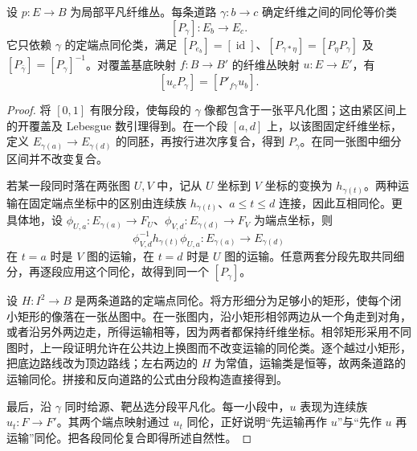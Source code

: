 \begin{proposition}\label{g2:prop:fiber-transport}
	设 \(p:E\to B\) 为局部平凡纤维丛。每条道路 \(\gamma:b\to c\) 确定纤维之间的同伦等价类
	\[
		[P_\gamma]:E_b\longrightarrow E_c.
	\]
	它只依赖 \(\gamma\) 的定端点同伦类，满足 \([P_{e_b}]=[\operatorname{id}]\)、\([P_{\gamma*\eta}]=[P_\eta P_\gamma]\) 及 \([P_{\bar\gamma}]=[P_\gamma]^{-1}\)。对覆盖基底映射 \(f:B\to B'\) 的纤维丛映射 \(u:E\to E'\)，有
	\[
		[u_cP_\gamma]=[P'_{f\gamma}u_b].
	\]
\end{proposition}
\begin{proof}
	将 \([0,1]\) 有限分段，使每段的 \(\gamma\) 像都包含于一张平凡化图；这由紧区间上的开覆盖及 Lebesgue 数引理得到。在一个段 \([a,d]\) 上，以该图固定纤维坐标，定义 \(E_{\gamma(a)}\to E_{\gamma(d)}\) 的同胚，再按行进次序复合，得到 \(P_\gamma\)。在同一张图中细分区间并不改变复合。

	若某一段同时落在两张图 \(U,V\) 中，记从 \(U\) 坐标到 \(V\) 坐标的变换为 \(h_{\gamma(t)}\)。两种运输在固定端点坐标中的区别由连续族 \(h_{\gamma(t)}\)、\(a\leq t\leq d\) 连接，因此互相同伦。更具体地，设 \(\phi_{U,a}:E_{\gamma(a)}\to F_U\)、\(\phi_{V,d}:E_{\gamma(d)}\to F_V\) 为端点坐标，则
	\[
		\phi_{V,d}^{-1}h_{\gamma(t)}\phi_{U,a}:E_{\gamma(a)}\longrightarrow E_{\gamma(d)}
	\]
	在 \(t=a\) 时是 \(V\) 图的运输，在 \(t=d\) 时是 \(U\) 图的运输。任意两套分段先取共同细分，再逐段应用这个同伦，故得到同一个 \([P_\gamma]\)。

	设 \(H:I^2\to B\) 是两条道路的定端点同伦。将方形细分为足够小的矩形，使每个闭小矩形的像落在一张丛图中。在一张图内，沿小矩形相邻两边从一个角走到对角，或者沿另外两边走，所得运输相等，因为两者都保持纤维坐标。相邻矩形采用不同图时，上一段证明允许在公共边上换图而不改变运输的同伦类。逐个越过小矩形，把底边路线改为顶边路线；左右两边的 \(H\) 为常值，运输类是恒等，故两条道路的运输同伦。拼接和反向道路的公式由分段构造直接得到。

	最后，沿 \(\gamma\) 同时给源、靶丛选分段平凡化。每一小段中，\(u\) 表现为连续族 \(u_t:F\to F'\)。其两个端点映射通过 \(u_t\) 同伦，正好说明“先运输再作 \(u\)”与“先作 \(u\) 再运输”同伦。把各段同伦复合即得所述自然性。
\end{proof}


